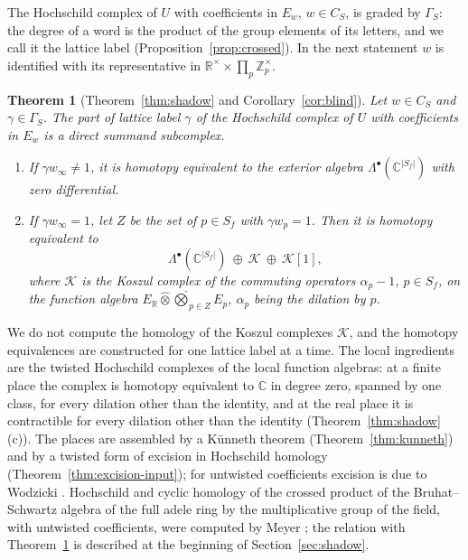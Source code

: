 \documentclass[11pt]{amsart}
\newtheorem{theorem}{Theorem}[section]
\theoremstyle{definition}
\theoremstyle{remark}
\newcommand{\C}{\mathbb C}
\newcommand{\R}{\mathbb R}
\newcommand{\Z}{\mathbb Z}
\begin{document}
The Hochschild complex of $U$ with coefficients in $E_w$, $w\in C_S$, is
graded by $\Gamma_S$: the degree of a word is the product of the group
elements of its letters, and we call it the lattice label
(Proposition~\ref{prop:crossed}).  In the next statement $w$ is identified
with its representative in $\R^{\times}\times\prod_p\Z_p^{\times}$.

\begin{theorem}[Theorem~\ref{thm:shadow} and
Corollary~\ref{cor:blind}]\label{thm:introH}
Let $w\in C_S$ and $\gamma\in\Gamma_S$.  The part of lattice label $\gamma$ of
the Hochschild complex of $U$ with coefficients in $E_w$ is a direct summand
subcomplex.
\begin{enumerate}
\item[(i)] If $\gamma w_{\infty}\ne1$, it is homotopy equivalent to the
exterior algebra $\Lambda^{\bullet}(\C^{|S_f|})$ with zero differential.
\item[(ii)] If $\gamma w_{\infty}=1$, let $Z$ be the set of $p\in S_f$ with
$\gamma w_p=1$.  Then it is homotopy equivalent to
\[
\Lambda^{\bullet}(\C^{|S_f|})\ \oplus\ \mathcal K\ \oplus\ \mathcal K[1],
\]
where $\mathcal K$ is the Koszul complex of the commuting operators
$\alpha_p-1$, $p\in S_f$, on the function algebra
$E_{\R}\widehat\otimes\widehat\bigotimes_{p\in Z}E_p$, $\alpha_p$ being the dilation
by $p$.
\end{enumerate}
\end{theorem}

We do not compute the homology of the Koszul complexes $\mathcal K$, and the
homotopy equivalences are constructed for one lattice label at a time.  The
local ingredients are the twisted Hochschild complexes of the local function
algebras: at a finite place the complex is homotopy equivalent to $\C$ in
degree zero, spanned by one class, for every dilation other than the identity, and at the real place
it is contractible for every dilation other than the identity
(Theorem~\ref{thm:shadow}(c)).  The places are assembled by a K\"unneth
theorem (Theorem~\ref{thm:kunneth}) and by a twisted form of excision in
Hochschild homology (Theorem~\ref{thm:excision-input}); for untwisted
coefficients excision is due to Wodzicki \cite{Wodzicki}.  Hochschild and
cyclic homology of the crossed product of the Bruhat--Schwartz algebra of the
full adele ring by the multiplicative group of the field, with untwisted
coefficients, were computed by Meyer \cite{MeyerCrossed}; the relation with
Theorem~\ref{thm:introH} is described at the beginning of
Section~\ref{sec:shadow}.
\end{document}
